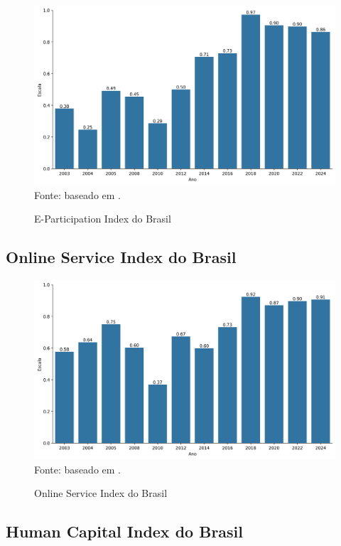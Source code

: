 \begin{figure}[H]
	\centering
	\caption{E-Participation Index do Brasil}
	\includegraphics[width=1\linewidth]{figuras/egdi/egdi_brasil_epart.png}
	\label{fig:egdi_brasil_epart}
	\footnotesize{Fonte: baseado em \cite{ONU_EGDI_mapa}.}
\end{figure}

\subsection{Online Service Index do Brasil}

\begin{figure}[H]
	\centering
	\caption{Online Service Index do Brasil}
	\includegraphics[width=1\linewidth]{figuras/egdi/egdi_brasil_osi.png}
	\label{fig:egdi_brasil_osi}
	\footnotesize{Fonte: baseado em \cite{ONU_EGDI_mapa}.}
\end{figure}

\subsection{Human Capital Index do Brasil}

